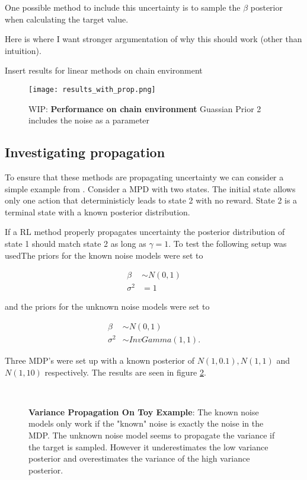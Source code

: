 One possible method to include this uncertainty is to sample the $\beta$ posterior when calculating the target value.

\todo Here is where I want stronger argumentation of why this should work (other than intuition).

\todo Insert results for linear methods on chain environment

\begin{figure}[H]
    \centering
    \texttt{[image: results\_with\_prop.png]}
    \caption{WIP: \textbf{Performance on chain environment} Guassian Prior 2 includes the noise as a parameter}
    \label{fig:results_no_propr}
\end{figure}

\subsection{Investigating propagation}

To ensure that these methods are propagating uncertainty we can consider a simple example from \cite{osband_2018}. Consider a MPD with two states. The initial state allows only one action that deterministicly leads to state 2 with no reward. State 2 is a terminal state with a known posterior distribution.

If a RL method properly propagates uncertainty the posterior distribution of state 1 should match state 2 as long as $\gamma=1$. To test the following setup was usedThe priors for the known noise models were set to

\begin{align*}
    \beta &\sim N(0,1)\\
    \sigma^2 &= 1
\end{align*}

and the priors for the unknown noise models were set to

\begin{align*}
    \beta &\sim N(0,1) \\
    \sigma^2 &\sim InvGamma(1,1).
\end{align*}

Three MDP's were set up with a known posterior of $N(1, 0.1), N(1, 1)$ and $N(1, 10)$ respectively. The results are seen in figure \ref{fig:proptest}.

\begin{figure}[H]
    \centering
    \\
    \caption{\textbf{Variance Propagation On Toy Example}: The known noise models only work if the "known" noise is exactly the noise in the MDP. The unknown noise model seems to propagate the variance if the target is sampled. However it underestimates the low variance posterior and overestimates the variance of the high variance posterior.}
    \label{fig:proptest}
\end{figure}

